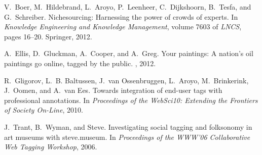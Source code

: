 \documentclass{sig-alternate-2013}
\begin{document}

\begin{thebibliography}{1}

V.~Boer, M.~Hildebrand, L.~Aroyo, P.~Leenheer, C.~Dijkshoorn, B.~Tesfa, and
  G.~Schreiber.
\newblock Nichesourcing: Harnessing the power of crowds of experts.
\newblock In {\em Knowledge Engineering and Knowledge Management}, volume 7603
  of {\em LNCS}, pages 16--20. Springer, 2012.

A.~Ellis, D.~Gluckman, A.~Cooper, and A.~Greg.
\newblock Your paintings: A nation's oil paintings go online, tagged by the
  public.
, 2012.

R.~Gligorov, L.~B. Baltussen, J.~van Ossenbruggen, L.~Aroyo, M.~Brinkerink,
  J.~Oomen, and A.~van Ees.
\newblock Towards integration of end-user tags with professional annotations.
\newblock In {\em Proceedings of the WebSci10: Extending the Frontiers of
  Society On-Line}, 2010.

J.~Trant, B.~Wyman, and Steve.
\newblock Investigating social tagging and folksonomy in art museums with
  steve.museum.
\newblock In {\em Proceedings of the WWW'06 Collaborative Web Tagging
  Workshop}, 2006.

\end{thebibliography}

\balancecolumns
\end{document}
